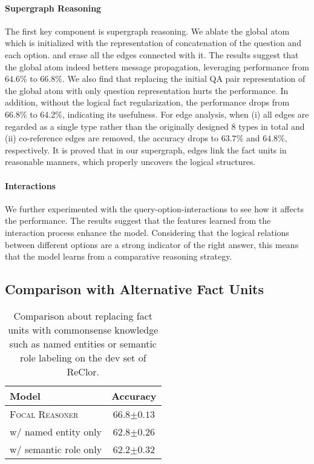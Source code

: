 \documentclass[11pt]{article}
\begin{document}
\paragraph{Supergraph Reasoning} The first key component is supergraph reasoning. We ablate the global atom which is initialized with the representation of concatenation of the question and each option. and erase all the edges connected with it. The results suggest that the global atom indeed betters message propagation, leveraging performance from $64.6\%$ to $66.8\%$. We also find that replacing the initial QA pair representation of the global atom with only question representation hurts the performance. In addition, without the logical fact regularization, the performance drops from $66.8\%$ to $64.2\%$, indicating its usefulness. For edge analysis, when (i) all edges are regarded as a single type rather than the originally designed 8 types in total and (ii) co-reference edges are removed, the accuracy drops to $63.7\%$ and $64.8\%$, respectively. It is proved that in our supergraph, edges link the fact units in reasonable manners, which properly uncovers the logical structures.

\paragraph{Interactions}

We further experimented with the query-option-interactions to see how it affects the performance. The results suggest that the features learned from the interaction process enhance the model. Considering that the logical relations between different options are a strong indicator of the right answer, this means that the model learns from a comparative reasoning strategy.

\subsection{Comparison with Alternative Fact Units}

\begin{table}
\centering
\setlength{\belowcaptionskip}{2pt}
\vspace*{-2mm}
\small
\setlength{\tabcolsep}{23.0pt}
\begin{tabular}{lc}
    \toprule
    Model    & Accuracy \\
    \midrule
    \textsc{Focal Reasoner} & 66.8\scriptsize$\pm 0.13$ \\
    \quad w/ named entity only & 62.8\scriptsize$\pm 0.26$ \\
    \quad w/ semantic role only & 62.2\scriptsize$\pm0.32$\\
    \bottomrule
\end{tabular}
  \caption{Comparison about replacing fact units with commonsense knowledge such as named entities or semantic role labeling on the dev set of ReClor.}\label{comp_facts}
\vspace*{-5mm}
\end{table}
\end{document}
